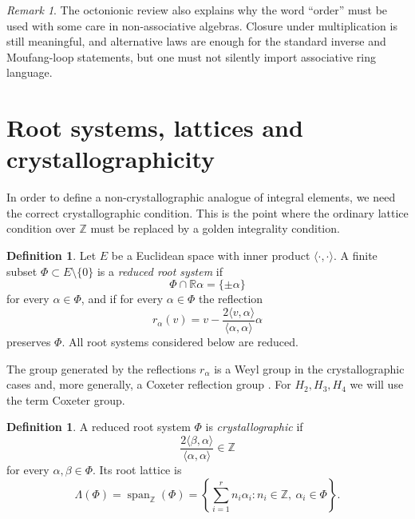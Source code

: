 \documentclass[12pt,oneside,english]{amsart}
\numberwithin{equation}{section}
\numberwithin{figure}{section}
\numberwithin{table}{section}
\theoremstyle{plain}
\theoremstyle{definition}
\newtheorem{definition}[theorem]{Definition}
\theoremstyle{remark}
\newtheorem{remark}[theorem]{Remark}
\newcommand{\ZZ}{\mathbb Z}
\newcommand{\RR}{\mathbb R}
\newcommand{\Span}{\operatorname{span}}
\begin{document}
\begin{remark}
The octonionic review also explains why the word ``order'' must be used with some care in non-associative algebras. Closure under multiplication is still meaningful, and alternative laws are enough for the standard inverse and Moufang-loop statements, but one must not silently import associative ring language.
\end{remark}

\section{Root systems, lattices and crystallographicity}

In order to define a non-crystallographic analogue of integral elements, we need the correct crystallographic condition. This is the point where the ordinary lattice condition over \(\ZZ\) must be replaced by a golden integrality condition.

\begin{definition}
Let \(E\) be a Euclidean space with inner product \(\langle\cdot,\cdot\rangle\). A finite subset \(\Phi\subset E\setminus\{0\}\) is a \emph{reduced root system} if
\begin{equation}
\Phi\cap\RR\alpha=\{\pm\alpha\}
\label{eq:root-line-condition}
\end{equation}
for every \(\alpha\in\Phi\), and if for every \(\alpha\in\Phi\) the reflection
\begin{equation}
r_\alpha(v)=v-\frac{2\langle v,\alpha\rangle}{\langle \alpha,\alpha\rangle}\alpha
\label{eq:root-reflection}
\end{equation}
preserves \(\Phi\). All root systems considered below are reduced.
\end{definition}

The group generated by the reflections \(r_\alpha\) is a Weyl group in the crystallographic cases and, more generally, a Coxeter reflection group \cite{Humphreys}. For \(H_2,H_3,H_4\) we will use the term Coxeter group.

\begin{definition}
A reduced root system \(\Phi\) is \emph{crystallographic} if
\begin{equation}
\frac{2\langle \beta,\alpha\rangle}{\langle \alpha,\alpha\rangle}\in\ZZ
\label{eq:crystallographic-condition}
\end{equation}
for every \(\alpha,\beta\in\Phi\). Its root lattice is
\begin{equation}
\Lambda(\Phi)=\Span_{\ZZ}(\Phi)
=\left\{\sum_{i=1}^r n_i\alpha_i:n_i\in\ZZ,\ \alpha_i\in\Phi\right\}.
\label{eq:root-lattice}
\end{equation}
\end{definition}
\end{document}

